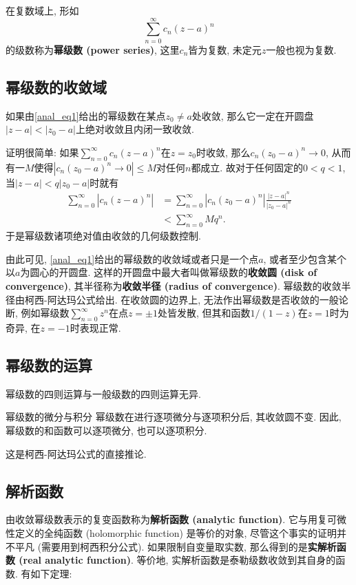 
在复数域上, 形如
\begin{equation}\label{anal_eq1}
\sum_{n=0}^\infty c_n(z-a)^n
\end{equation}
的级数称为\textbf{幂级数 (power series)}, 这里$c_n$皆为复数, 未定元$z$一般也视为复数. 

\subsection{幂级数的收敛域}
\begin{theorem}{}
如果由\autoref{anal_eq1}给出的幂级数在某点$z_0\neq a$处收敛, 那么它一定在开圆盘$|z-a|<|z_0-a|$上绝对收敛且内闭一致收敛.
\end{theorem}

证明很简单: 如果$\sum_{n=0}^\infty c_n(z-a)^n$在$z=z_0$时收敛, 那么$c_n(z_0-a)^n\to0$, 从而有一$M$使得$|c_n(z_0-a)^n\to0|\leq M$对任何$n$都成立. 故对于任何固定的$0<q<1$, 当$|z-a|<q|z_0-a|$时就有
$$
\begin{aligned}
\sum_{n=0}^\infty |c_n(z-a)^n|
&=\sum_{n=0}^\infty |c_n(z_0-a)^n|\frac{|z-a|^n}{|z_0-a|^n}\\
&<\sum_{n=0}^\infty Mq^n.
\end{aligned}
$$
于是幂级数诸项绝对值由收敛的几何级数控制.

由此可见, \autoref{anal_eq1}给出的幂级数的收敛域或者只是一个点$a$, 或者至少包含某个以$a$为圆心的开圆盘. 这样的开圆盘中最大者叫做幂级数的\textbf{收敛圆 (disk of convergence)}, 其半径称为\textbf{收敛半径 (radius of convergence)}. 幂级数的收敛半径由柯西-阿达玛公式给出. 在收敛圆的边界上, 无法作出幂级数是否收敛的一般论断, 例如幂级数$\sum_{n=0}^\infty z^n$在点$z=\pm1$处皆发散, 但其和函数$1/(1-z)$在$z=1$时为奇异, 在$z=-1$时表现正常.

\subsection{幂级数的运算}
幂级数的四则运算与一般级数的四则运算无异.

\begin{theorem}{幂级数的微分与积分}
幂级数在进行逐项微分与逐项积分后, 其收敛圆不变. 因此, 幂级数的和函数可以逐项微分, 也可以逐项积分.
\end{theorem}
这是柯西-阿达玛公式的直接推论. 

\subsection{解析函数}
由收敛幂级数表示的复变函数称为\textbf{解析函数 (analytic function)}. 它与用复可微性定义的全纯函数 (holomorphic function) 是等价的对象, 尽管这个事实的证明并不平凡 (需要用到柯西积分公式). 如果限制自变量取实数, 那么得到的是\textbf{实解析函数 (real analytic function)}. 等价地, 实解析函数是泰勒级数收敛到其自身的函数. 有如下定理:

